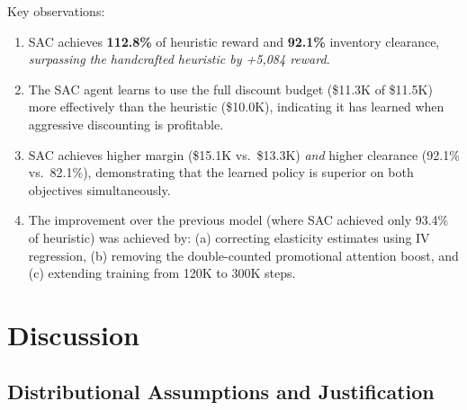 \documentclass[11pt,a4paper]{article}
\begin{document}
Key observations:
\begin{enumerate}
    \item SAC achieves \textbf{112.8\%} of heuristic reward and \textbf{92.1\%} inventory clearance, \emph{surpassing the handcrafted heuristic by +5,084 reward}.
    \item The SAC agent learns to use the full discount budget (\$11.3K of \$11.5K) more effectively than the heuristic (\$10.0K), indicating it has learned when aggressive discounting is profitable.
    \item SAC achieves higher margin (\$15.1K vs.\ \$13.3K) \emph{and} higher clearance (92.1\% vs.\ 82.1\%), demonstrating that the learned policy is superior on both objectives simultaneously.
    \item The improvement over the previous model (where SAC achieved only 93.4\% of heuristic) was achieved by: (a) correcting elasticity estimates using IV regression, (b) removing the double-counted promotional attention boost, and (c) extending training from 120K to 300K steps.
\end{enumerate}

\section{Discussion}
\label{sec:discussion}

\subsection{Distributional Assumptions and Justification}
\end{document}
